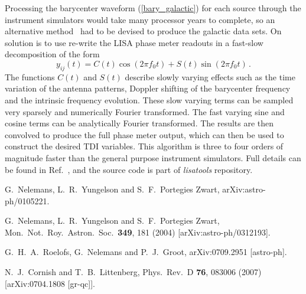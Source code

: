 \documentclass[12pt]{article}
\begin{document}
Processing the barycenter waveform (\ref{bary_galactic}) for each source through the instrument simulators
would take many processor years to complete, so an alternative method~\cite{Cornish:2007if} had to be devised to produce the
galactic data sets. On solution is to use re-write the LISA phase meter readouts in a fast-slow decomposition of
the form
\begin{equation}
y_{ij}(t) = C(t) \cos(2 \pi f_0 t) + S(t) \sin(2 \pi f_0 t) \, .
\end{equation}
The functions $C(t)$ and $S(t)$ describe slowly varying effects such as the time variation of the
antenna patterns, Doppler shifting of the barycenter frequency and the intrinsic frequency evolution.
These slow varying terms can be sampled very sparsely and numerically Fourier transformed. The fast
varying sine and cosine terms can be analytically Fourier transformed. The results are then
convolved to produce the full phase meter output, which can then be used to construct the desired
TDI variables. This algorithm is three to four orders of magnitude faster than the general
purpose instrument simulators. Full details can be found in Ref.~\cite{Cornish:2007if}, and the
source code is part of {\it lisatools} repository.




\begin{thebibliography}{99}

  G.~Nelemans, L.~R.~Yungelson and S.~F.~Portegies Zwart,
  arXiv:astro-ph/0105221.

  G.~Nelemans, L.~R.~Yungelson and S.~F.~Portegies Zwart,
  Mon.\ Not.\ Roy.\ Astron.\ Soc.\  {\bf 349}, 181 (2004)
  [arXiv:astro-ph/0312193].

  G.~H.~A.~Roelofs, G.~Nelemans and P.~J.~Groot,
  arXiv:0709.2951 [astro-ph].

  N.~J.~Cornish and T.~B.~Littenberg,
  Phys.\ Rev.\  D {\bf 76}, 083006 (2007)
  [arXiv:0704.1808 [gr-qc]].

\end{thebibliography}
\end{document}
